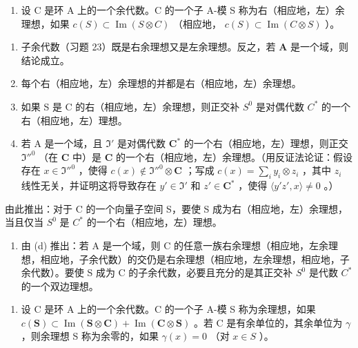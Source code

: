 \begin{enumerate}
\def\labelenumi{\arabic{enumi}.}
\setcounter{enumi}{23}
\tightlist
\item
  设 C 是环 A 上的一个余代数。C 的一个子 A-模 S 称为右（相应地，左）余理想，如果 \(c(S) \subset \operatorname{Im}(S \otimes C)\) （相应地， \(c(S) \subset \operatorname{Im}(C \otimes S)\) ）。
\end{enumerate}

\begin{enumerate}
\def\labelenumi{(\alph{enumi})}
\item
  子余代数（习题 23）既是右余理想又是左余理想。反之，若 \(\mathbf{A}\) 是一个域，则结论成立。
\item
  每个右（相应地，左）余理想的并都是右（相应地，左）余理想。
\item
  如果 S 是 C 的右（相应地，左）余理想，则正交补 \(S^{0}\) 是对偶代数 \(C^{*}\) 的一个右（相应地，左）理想。
\item
  若 A 是一个域，且 \(\mathfrak{I}'\) 是对偶代数 \(\mathbf{C}^*\) 的一个右（相应地，左）理想，则正交 \(\mathfrak{I}''^0\) （在 \(\mathbf{C}\) 中）是 \(\mathbf{C}\) 的一个右（相应地，左）余理想。（用反证法论证：假设存在 \(x \in \mathfrak{I}''^0\) ，使得 \(c(x) \notin \mathfrak{I}''^0 \otimes \mathbf{C}\) ；写成 \(c(x) = \sum_{i} y_i \otimes z_i\) ，其中 \(z_i\) 线性无关，并证明这将导致存在 \(y' \in \mathfrak{I}'\) 和 \(z' \in \mathbf{C}^*\) ，使得 \(\langle y' z', x \rangle \neq 0\) 。）
\end{enumerate}

由此推出：对于 C 的一个向量子空间 S，要使 S 成为右（相应地，左）余理想，当且仅当 \(S^{0}\) 是 \(C^{*}\) 的一个右（相应地，左）理想。

\begin{enumerate}
\def\labelenumi{(\alph{enumi})}
\setcounter{enumi}{4}
\tightlist
\item
  由 (d) 推出：若 A 是一个域，则 C 的任意一族右余理想（相应地，左余理想，相应地，子余代数）的交仍是右余理想（相应地，左余理想，相应地，子余代数）。要使 S 成为 C 的子余代数，必要且充分的是其正交补 \(S^{0}\) 是代数 \(C^{*}\) 的一个双边理想。
\end{enumerate}

\begin{enumerate}
\def\labelenumi{\arabic{enumi}.}
\setcounter{enumi}{24}
\tightlist
\item
  设 C 是环 A 上的一个余代数。C 的一个子 A-模 S 称为余理想，如果 \(c(\mathbf{S}) \subset \operatorname{Im}(\mathbf{S} \otimes \mathbf{C}) + \operatorname{Im}(\mathbf{C} \otimes \mathbf{S})\) 。若 C 是有余单位的，其余单位为 \(\gamma\) ，则余理想 S 称为余零的，如果 \(\gamma(x) = 0\) （对 \(x \in S\) ）。
\end{enumerate}

